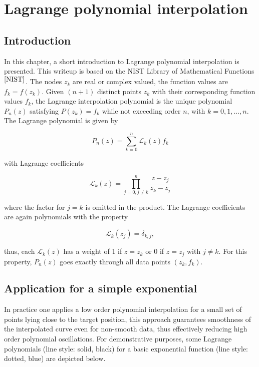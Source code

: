\documentclass[./main.tex]{subfiles}
\begin{document}
      
\chapter{Lagrange polynomial interpolation}
\label{chap:AppendixA}

\section{Introduction}

In this chapter, a short introduction to Lagrange polynomial interpolation is presented. This writeup is based on the NIST Library of Mathematical Functions $^{\cite{NIST}}$. \newline
The nodes $z_k$ are real or complex valued, the function values are $f_k = f(z_k)$.
Given $(n+1)$ distinct points $z_k$ with their corresponding function values $f_k$, the Lagrange interpolation polynomial is the unique polynomial $P_n(z)$ satisfying $P(z_k)=f_k$ while not exceeding order $n$, with $k = 0,1,...,n$. The Lagrange polynomial is given by

\begin{equation*}
	P_n(z) = \sum_{k=0}^{n} \mathscr{L}_k(z)f_k 
\end{equation*}

with Lagrange coefficients

\begin{equation*}
\mathscr{L}_k(z) =  \prod_{j=0, j \neq k}^{n} \frac{z-z_j}{z_k-z_j}
\end{equation*}

where the factor for $j=k$ is omitted in the product. The Lagrange coefficients are again polynomials with the property

\begin{equation*}
\mathscr{L}_k(z_j) =  \delta_{k,j},
\end{equation*}

thus, each $\mathscr{L}_k(z)$ has a weight of 1 if $z = z_k$ or 0 if $z = z_j$ with $j \ne k$. For this property, $P_n(z)$ goes exactly through all data points $(z_k,f_k)$. 

\section{Application for a simple exponential}
In practice one applies a low order polynomial interpolation for a small set of points lying close to the target position, this approach guarantees smoothness of the interpolated curve even for non-smooth data, thus effectively reducing high order polynomial oscillations.
For demonstrative purposes, some Lagrange polynomials (line style: solid, black) for a basic exponential function (line style: dotted, blue) are depicted below.
\end{document}
